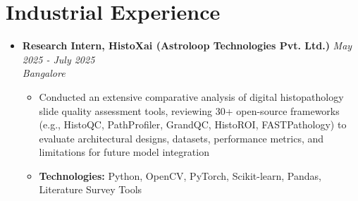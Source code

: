 \documentclass[a4paper,9pt]{article}
\newcommand{\resumeProject}[4]{
    \item\small{
        \textbf{#1} \hfill \textit{#2}\\
        \textit{#3}\\
        \begin{itemize}[leftmargin=1.5em,label=\textbullet,nosep,itemsep=0.5pt]
            #4
        \end{itemize}
    }\vspace{2pt}
}
\newcommand{\compactSection}[2]{
    \section{#1}
    \vspace{-0.1cm}
    #2
    \vspace{-0.2cm}
}
\begin{document}
\compactSection{Industrial Experience}{
\begin{itemize}[leftmargin=*,label={},itemsep=4pt]
    \resumeProject{Research Intern, HistoXai (Astroloop Technologies Pvt. Ltd.)}{May 2025 - July 2025}
    {Bangalore}
    {\item Conducted an extensive comparative analysis of digital histopathology slide quality assessment tools, reviewing 30+ open-source frameworks (e.g., HistoQC, PathProfiler, GrandQC, HistoROI, FASTPathology) to evaluate architectural designs, datasets, performance metrics, and limitations for future model integration
    \item \textbf{Technologies:} Python, OpenCV, PyTorch, Scikit-learn, Pandas, Literature Survey Tools}

\end{itemize}
}
\end{document}

